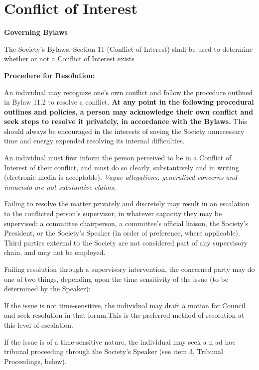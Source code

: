 \section{Conflict of Interest}


\begin{longenum}[ label*=\arabic*., align=left]
\item  \textbf{Governing Bylaws}

	\begin{longenum}[ label*=\arabic*., align=left]
		\item The Society's Bylaws, Section 11 (Conflict of Interest) shall be used to determine whether or not a Conflict of Interest exists
	\end{longenum}
\item \textbf{Procedure for Resolution:}
	\begin{longenum}[ label*=\arabic*., align=left]
		\item An individual may recognize one's own conflict and follow the procedure outlined in Bylaw 11.2 to resolve a conflict. \textbf{At any point in the following procedural outlines and policies, a person may acknowledge their own conflict and seek steps to resolve it privately, in accordance with the Bylaws.} This should always be encouraged in the interests of saving the Society unnecessary time and energy expended resolving its internal difficulties.
        \item An individual must first inform the person perceived to be in a Conflict of Interest of their conflict, and must do so clearly, substantively and in writing (electronic media is acceptable). \textit{Vague allegations, generalized concerns and innuendo are not substantive claims.}
        \item Failing to resolve the matter privately and discretely may result in an escalation to the conflicted person's supervisor, in whatever capacity they may be supervised: a committee chairperson, a committee's official liaison, the Society's President, or the Society's Speaker (in order of preference, where applicable). Third parties external to the Society are not considered part of any supervisory chain, and may not be employed.
		\item Failing resolution through a supervisory intervention, the concerned party may do one of two things, depending upon the time sensitivity of the issue (to be determined by the Speaker):
		\begin{longenum}[ label*=\arabic*., align=left]
			\item If the issue is not time-sensitive, the individual may draft a motion for Council and seek resolution in that forum.This is the preferred method of resolution at this level of escalation.
            \item If the issue is of a time-sensitive nature, the individual may seek a n ad hoc tribunal proceeding through the Society's Speaker (see item 3, Tribunal Proceedings, below).
            

\end{longenum}
\end{longenum}
\end{longenum}
